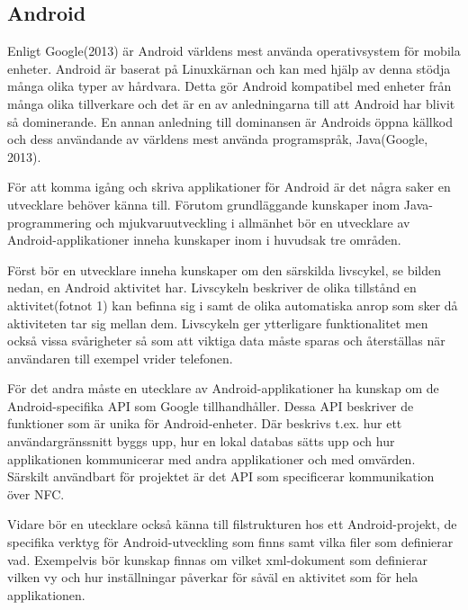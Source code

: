 \documentclass[11pt]{article}
\begin{document}
\subsection{Android}
Enligt Google(2013) är Android världens mest använda operativsystem för mobila enheter. Android är baserat på Linuxkärnan och kan med hjälp av denna stödja många olika typer av hårdvara. Detta gör Android kompatibel med enheter från många olika tillverkare och det är en av anledningarna till att Android har blivit så dominerande. En annan anledning till dominansen är Androids öppna källkod och dess användande av världens mest använda programspråk, Java(Google, 2013).

För att komma igång och skriva applikationer för Android är det några saker en utvecklare behöver känna till. Förutom grundläggande kunskaper inom Java-programmering och mjukvaruutveckling i allmänhet bör en utvecklare av Android-applikationer inneha kunskaper inom i huvudsak tre områden.

Först bör en utvecklare inneha kunskaper om den särskilda livscykel, se bilden nedan, en Android aktivitet har. Livscykeln beskriver de olika tillstånd en aktivitet(fotnot 1) kan befinna sig i samt de olika automatiska anrop som sker då aktiviteten tar sig mellan dem. Livscykeln ger ytterligare funktionalitet men också vissa svårigheter så som att viktiga data måste sparas och återställas när användaren till exempel vrider telefonen.


För det andra måste en utecklare av Android-applikationer ha kunskap om de Android-specifika API som Google tillhandhåller. Dessa API beskriver de funktioner som är unika för Android-enheter. Där beskrivs t.ex. hur ett användargränssnitt byggs upp, hur en lokal databas sätts upp och hur applikationen kommunicerar med andra applikationer och med omvärden. Särskilt användbart för projektet är det API som specificerar kommunikation över NFC.

Vidare bör en utecklare också känna till filstrukturen hos ett Android-projekt, de specifika verktyg för Android-utveckling som finns samt vilka filer som definierar vad. Exempelvis bör kunskap finnas om vilket xml-dokument som definierar vilken vy och hur inställningar påverkar för såväl en aktivitet som för hela applikationen.
\end{document}
